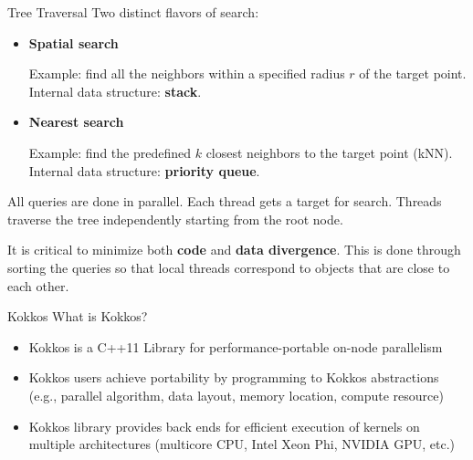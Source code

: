 \documentclass[final,hyperref={pdfpagelabels=false}]{beamer}
\begin{document}
\begin{frame}[t,fragile]
\begin{columns}[t]
\begin{column}{.480\textwidth}
\begin{block}{\centering Tree Traversal}
  Two distinct flavors of search:

  \begin{itemize}
    \item \textbf{Spatial search}

      Example: find all the neighbors within a specified radius $r$ of the target point.
      Internal data structure: \textbf{stack}.

    \item \textbf{Nearest search}

      Example: find the predefined $k$ closest neighbors to the target point
      (kNN).
      Internal data structure: \textbf{priority queue}.

  \end{itemize}

  All queries are done in parallel. Each thread gets a target for search.
  Threads traverse the tree independently starting from the root
  node.

  It is critical to minimize both \textbf{code} and \textbf{data divergence}.
  This is done through sorting the queries so that local threads correspond to
  objects that are close to each other.

\end{block}

\begin{block}{\centering Kokkos}
  What is Kokkos?
  \begin{itemize}
    \item Kokkos is a C++11 Library for performance-portable on-node parallelism
    \item Kokkos users achieve portability by programming to Kokkos
      abstractions (e.g., parallel algorithm, data layout, memory location,
      compute resource)
    \item Kokkos library provides back ends for efficient execution of kernels
      on multiple architectures (multicore CPU, Intel Xeon Phi, NVIDIA GPU, etc.)
  \end{itemize}
\end{block}


\end{column}
\end{columns}
\end{frame}
\end{document}
